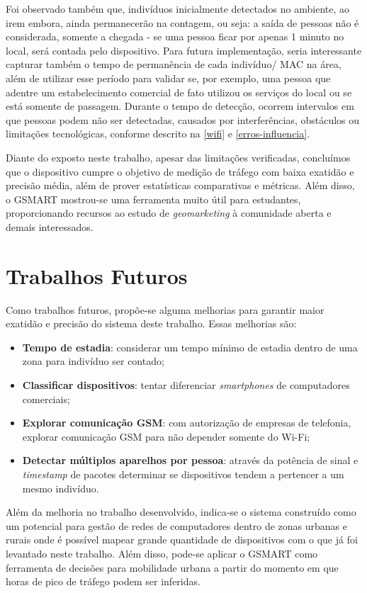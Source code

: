 Foi observado também que, indivíduos inicialmente detectados no ambiente, ao irem embora, ainda permanecerão na contagem, ou seja: a saída de pessoas não é considerada, somente a chegada - se uma pessoa ficar por apenas 1 minuto no local, será contada pelo dispositivo. Para futura implementação, seria interessante capturar também o tempo de permanência de cada indivíduo/ MAC na área, além de utilizar esse período para validar se, por exemplo, uma pessoa que adentre um estabelecimento comercial de fato utilizou os serviços do local ou se está somente de passagem. Durante o tempo de detecção, ocorrem intervalos em que pessoas podem não ser detectadas, causados por interferências, obstáculos ou limitações tecnológicas, conforme descrito na \autoref{wifi} e \autoref{erros-influencia}.

Diante do exposto neste trabalho, apesar das limitações verificadas, concluímos
que o dispositivo cumpre o objetivo de medição de tráfego com baixa exatidão e precisão média,
além de prover
estatísticas comparativas e métricas. Além disso, o GSMART mostrou-se uma
ferramenta muito útil para estudantes, proporcionando recursos ao estudo de
\emph{geomarketing} à comunidade aberta e demais interessados.


\section{Trabalhos Futuros}
Como trabalhos futuros, propõe-se alguma melhorias para garantir maior exatidão e
precisão do sistema deste trabalho. Essas melhorias são:
\begin{itemize}
    \item \textbf{Tempo de estadia}: considerar um tempo mínimo de estadia dentro de uma zona para indivíduo ser
    contado;
    \item \textbf{Classificar dispositivos}: tentar diferenciar \emph{smartphones} de computadores comerciais;
    \item \textbf{Explorar comunicação GSM}: com autorização de empresas de telefonia, explorar comunicação GSM
    para não depender somente do Wi-Fi;
    \item \textbf{Detectar múltiplos aparelhos por pessoa}: através da potência de sinal e \emph{timestamp}
    de pacotes determinar se dispositivos tendem a pertencer a um mesmo indivíduo.
\end{itemize}

Além da melhoria no trabalho desenvolvido, indica-se o sistema construído como um potencial para gestão de redes
de computadores dentro de zonas urbanas e rurais onde é possível mapear grande quantidade de dispositivos com o
que já foi levantado neste trabalho. Além disso, pode-se aplicar o GSMART como ferramenta de decisões para mobilidade
urbana a partir do momento em que horas de pico de tráfego podem ser inferidas.
